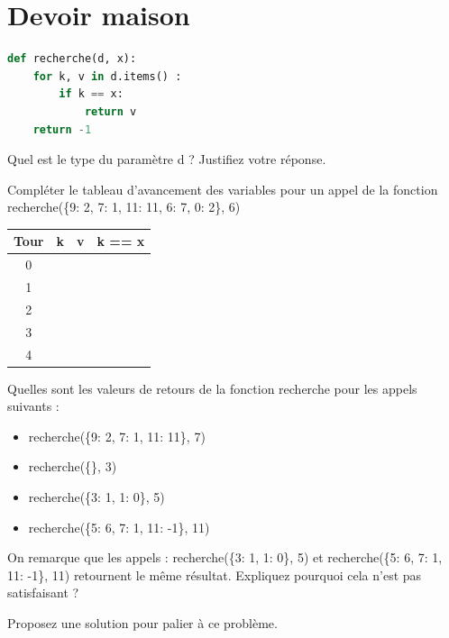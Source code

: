 \section*{Devoir maison}


\begin{lstlisting}[language=Python]
def recherche(d, x):
    for k, v in d.items() :
        if k == x:
            return v
    return -1
\end{lstlisting}

\begin{Exercise}[title={Recherche linéaire}]

\Question Quel est le type du paramètre d ? Justifiez votre réponse. \\
\emptybox{1cm}

\Question Compléter le tableau d'avancement des variables pour un appel de la fonction recherche(\{9: 2, 7: 1, 11: 11, 6: 7, 0: 2\}, 6) \\

\begin{center}
\large
\begin{tabular}{c|c|c|c|}
\textbf{Tour} & \textbf{k} & \textbf{v} & \textbf{k == x}  \\
\hline
0 &  &  &  \\
1 &  &  &  \\
2 &  &  &  \\
3 &  &  &  \\
4 &  &  &  \\
\end{tabular}
\end{center}

\Question Quelles sont les valeurs de retours de la fonction recherche pour les appels suivants : \\
\begin{itemize}
    \item recherche(\{9: 2, 7: 1, 11: 11\}, 7)
    \item recherche(\{\}, 3)
    \item recherche(\{3: 1, 1: 0\}, 5)
    \item recherche(\{5: 6, 7: 1, 11: -1\}, 11)
\end{itemize}

\Question On remarque que les appels : recherche(\{3: 1, 1: 0\}, 5) et recherche(\{5: 6, 7: 1, 11: -1\}, 11) retournent le même résultat. Expliquez pourquoi cela n'est pas satisfaisant ? \\
\emptybox{5cm}

\Question Proposez une solution pour palier à ce problème.\\
\emptybox{5cm}

\end{Exercise}
